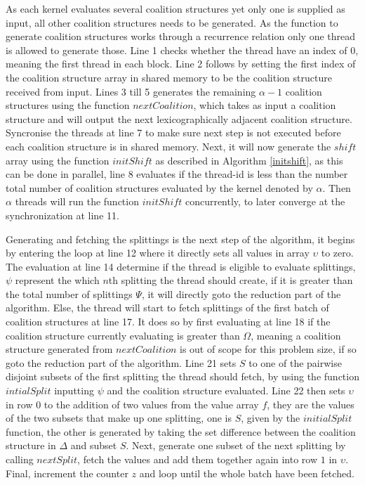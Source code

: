 \documentclass{llncs}
\begin{document}
As each kernel evaluates several coalition structures yet only one is supplied as input, all other coalition structures needs to be generated. As the function to generate coalition structures works through a recurrence relation only one thread is allowed to generate those. Line 1 checks whether the thread have an index of 0, meaning the first thread in each block. Line 2 follows by setting the first index of the coalition structure array in shared memory to be the coalition structure received from input. Lines 3 till 5 generates the remaining $\alpha - 1$ coalition structures using the function $nextCoalition$, which takes as input a coalition structure and will output the next lexicographically adjacent coalition structure.  Syncronise the threads at line 7 to make sure next step is not executed before each coalition structure is in shared memory. Next, it will now generate the $shift$ array using the function $initShift$ as described in Algorithm \ref{initshift}, as this can be done in parallel, line 8 evaluates if the thread-id is less than the number total number of coalition structures evaluated by the kernel denoted by $\alpha$. Then $\alpha$ threads will run the function $initShift$ concurrently, to later converge at the synchronization at line 11.

Generating and fetching the splittings is the next step of the algorithm, it begins by entering the loop at line 12 where it directly sets all values in array $\upsilon$ to zero. The evaluation at line 14 determine if the thread is eligible to evaluate splittings, $\psi$ represent the which $n$th splitting the thread should create, if it is greater than the total number of splittings $\Psi$, it will directly goto the reduction part of the algorithm. Else, the thread will start to fetch splittings of the first batch of coalition structures at line 17. It does so by first evaluating at line 18 if the coalition structure currently evaluating is greater than $\Omega$, meaning a coalition structure generated from $nextCoalition$ is out of scope for this problem size, if so goto the reduction part of the algorithm. Line 21 sets $S$ to one of the pairwise disjoint subsets of the first splitting the thread should fetch, by using the function $intialSplit$ inputting $\psi$ and the coalition structure evaluated. Line 22 then sets $\upsilon$ in row 0 to the addition of two values from the value array $f$, they are the values of the two subsets that make up one splitting, one is $S$, given by the $initialSplit$ function, the other is generated by taking the set difference between the coalition structure in $\Delta$ and subset $S$. Next, generate one subset of the next splitting by calling $nextSplit$, fetch the values and add them together again into row $1$ in $\upsilon$. Final, increment the counter $z$ and loop until the whole batch have been fetched.
\end{document}
